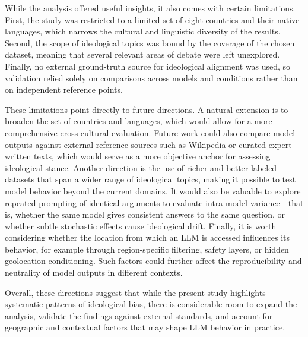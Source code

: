 
While the analysis offered useful insights, it also comes with certain limitations.
First, the study was restricted to a limited set of eight countries and their native
languages, which narrows the cultural and linguistic diversity of the results.
Second, the scope of ideological topics was bound by the coverage of the chosen dataset,
meaning that several relevant areas of debate were left unexplored. Finally, no
external ground-truth source for ideological alignment was used, so validation relied
solely on comparisons across models and conditions rather than on independent reference points.

These limitations point directly to future directions. A natural extension is to broaden
the set of countries and languages, which would allow for a more comprehensive
cross-cultural evaluation. Future work could also compare model outputs against external
reference sources such as Wikipedia or curated expert-written texts, which would serve as
a more objective anchor for assessing ideological stance. Another direction is the use of
richer and better-labeled datasets that span a wider range of ideological topics,
making it possible to test model behavior beyond the current domains. It would also be
valuable to explore repeated prompting of identical arguments to evaluate intra-model
variance—that is, whether the same model gives consistent answers to the same question,
or whether subtle stochastic effects cause ideological drift. Finally, it is worth
considering whether the location from which an LLM is accessed influences its behavior,
for example through region-specific filtering, safety layers, or hidden geolocation
conditioning. Such factors could further affect the reproducibility and neutrality of
model outputs in different contexts.

Overall, these directions suggest that while the present study highlights systematic
patterns of ideological bias, there is considerable room to expand the analysis, validate
the findings against external standards, and account for geographic and contextual
factors that may shape LLM behavior in practice.
